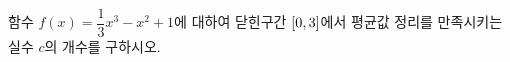 함수 $f(x)=\dfrac{1}{3}x^3-x^2+1$에 대하여 닫힌구간 $[0{,}\mkern3mu\mathopen{}3]$에서 평균값 정리를 만족시키는 실수 $c$의 개수를 구하시오.

